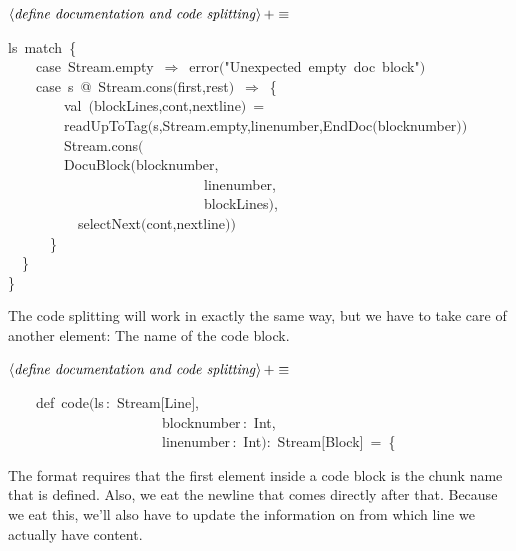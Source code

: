 \documentclass[a4paper,12pt]{article}
\begin{document}
$\left<\mbox{\emph{define documentation and code splitting}}\right>+\equiv$
\begin{program}ls~{\vem match}~{\small\{}
\\~~~~{\vem case}~Stream.empty~$\Rightarrow$~error$($"Unexpected~empty~doc~block"$)$
\\~~~~{\vem case}~s~@~Stream.cons$($first,rest$)$~$\Rightarrow$~{\small\{}
\\~~~~~~~~{\vem val}~$($blockLines,cont,nextline$)$~=
\\~~~~~~~~readUpToTag$($s,Stream.empty,linenumber,EndDoc$($blocknumber$)$$)$
\\~~~~~~~~Stream.cons$($
\\~~~~~~~~DocuBlock$($blocknumber,
\\~~~~~~~~~~~~~~~~~~~~~~~~~~~~linenumber,
\\~~~~~~~~~~~~~~~~~~~~~~~~~~~~blockLines$)$,
\\~~~~~~~~~~selectNext$($cont,nextline$)$$)$
\\~~~~~~{\small\}}
\\~~{\small\}}
\\{\small\}}
\\[0.5em]\end{program}


The code splitting will work in exactly the same way, but we have to
take care of another element: The name of the code block.

$\left<\mbox{\emph{define documentation and code splitting}}\right>+\equiv$
\begin{program}~~~~{\vem def}~code$($ls\,{\rm :}~Stream$[$Line$]$,
\\~~~~~~~~~~~~~~~~~~~~~~blocknumber\,{\rm :}~Int,
\\~~~~~~~~~~~~~~~~~~~~~~linenumber\,{\rm :}~Int$)${\rm :}~Stream$[$Block$]$~=~{\small\{}
\\[0.5em]\end{program}



The format requires that the first element inside a code block is
the chunk name that is defined. Also, we eat the newline that comes
directly after that. Because we eat this, we'll also have to update
the information on from which line we actually have content.
\end{document}
